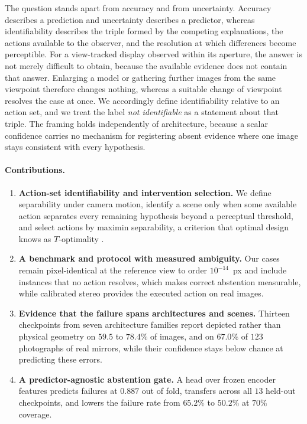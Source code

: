 \documentclass{article} %
\theoremstyle{defstyle}
\theoremstyle{plain}
\begin{document}
The question stands apart from accuracy and from uncertainty. Accuracy describes a
prediction and uncertainty describes a predictor, whereas identifiability describes the
triple formed by the competing explanations, the actions available to the observer, and the
resolution at which differences become perceptible. For a view-tracked display observed
within its aperture, the answer is not merely difficult to obtain, because the available
evidence does not contain that answer. Enlarging a model or gathering further images from
the same viewpoint therefore changes nothing, whereas a suitable change of viewpoint
resolves the case at once. We accordingly define identifiability relative to an action set,
and we treat the label \emph{not identifiable} as a statement about that triple. The framing
holds independently of architecture, because a scalar confidence carries no mechanism for
registering absent evidence where one image stays consistent with every hypothesis.

\paragraph{Contributions.}

\begin{enumerate}[nosep,leftmargin=*,topsep=2pt]

\item \textbf{Action-set identifiability and intervention selection.} We define separability
under camera motion, identify a scene only when some available action separates every
remaining hypothesis beyond a perceptual threshold, and select actions by maximin
separability, a criterion that optimal design knows as $T$-optimality
\citep{atkinson1975design,hunter1965experimental}.

\item \textbf{A benchmark and protocol with measured ambiguity.} Our cases remain
pixel-identical at the reference view to order $10^{-14}$~px and include instances that no
action resolves, which makes correct abstention measurable, while calibrated stereo provides
the executed action on real images.

\item \textbf{Evidence that the failure spans architectures and scenes.} Thirteen
checkpoints from seven architecture families report depicted rather than physical geometry on
$59.5$ to $78.4\%$ of images, and on $67.0\%$ of $123$ photographs of real mirrors, while
their confidence stays below chance at predicting these errors.

\item \textbf{A predictor-agnostic abstention gate.} A head over frozen encoder features
predicts failures at $0.887$ out of fold, transfers across all $13$ held-out checkpoints,
and lowers the failure rate from $65.2\%$ to $50.2\%$ at $70\%$ coverage.

\end{enumerate}
\end{document}
